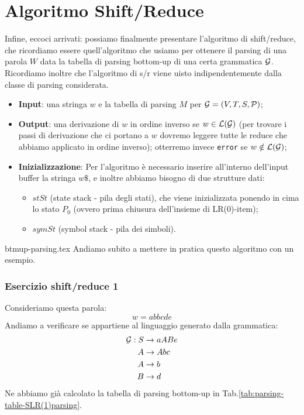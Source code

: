 \documentclass[class=book, crop=false, oneside, 12pt]{standalone}
\begin{document}
\section{Algoritmo Shift/Reduce}
Infine, eccoci arrivati: possiamo finalmente presentare l'algoritmo di shift/reduce, che ricordiamo essere quell'algoritmo che usiamo per ottenere il parsing di una parola \(W\) data la tabella di parsing bottom-up di una certa grammatica \(\mathcal{G}\). Ricordiamo inoltre che l'algoritmo di s/r viene uisto indipendentemente dalla classe di parsing considerata.
\begin{itemize}
    \item \textbf{Input}: una stringa \(w\) e la tabella di parsing \(M\) per \(\mathcal{G} = (V, T, S, \mathcal{P})\);
    \item \textbf{Output}: una derivazione di \(w\) in ordine inverso se \(w \in \mathcal{L}(\mathcal{G})\) (per trovare i passi di derivazione che ci portano a \(w\) dovremo leggere tutte le reduce che abbiamo applicato in ordine inverso); otterremo invece \texttt{error} se \(w \notin \mathcal{L}(\mathcal{G})\);
    \item \textbf{Inizializzazione}: Per l'algoritmo è necessario inserire all'interno dell'input buffer la stringa \(w\$\), e inoltre abbiamo bisogno di due strutture dati:
    \begin{itemize}
        \item \(stSt\) (state stack - pila degli stati), che viene inizializzata ponendo in cima lo stato \(P_0\) (ovvero prima chiusura dell'insieme di LR(0)-item);
        \item \(symSt\) (symbol stack - pila dei simboli).
    \end{itemize}
\end{itemize}

{btmup-parsing.tex}
Andiamo subito a mettere in pratica questo algoritmo con un esempio.

\subsubsection{Esercizio shift/reduce 1}
Consideriamo questa parola:
\begin{equation*}
    w = abbcde
\end{equation*}
Andiamo a verificare se appartiene al linguaggio generato dalla grammatica:
\begin{align}
    \label{eq:grammar-ex-sh/re-1}
    \mathcal{G}: S &\to aABe \\
    A &\to Abc \nonumber \\ \notag
    A &\to b \nonumber \\ \notag
    B &\to d  \nonumber \notag
\end{align}
Ne abbiamo già calcolato la tabella di parsing bottom-up in Tab.\ref{tab:parsing-table-SLR(1)parsing}.
\end{document}
